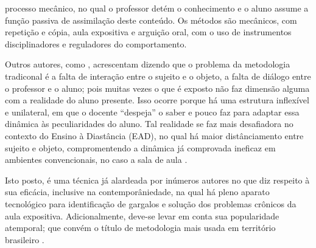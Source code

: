 \begin{customquote}
    [...] processo mecânico, no qual o professor detém o conhecimento e o aluno assume a função passiva de assimilação deste conteúdo. Os métodos são mecânicos, com repetição e cópia, aula expositiva e arguição oral, com o uso de instrumentos disciplinadores e reguladores do comportamento. \cite{baldanRepresentacaoAtoEnsinar2011}
\end{customquote}

Outros autores, como , acrescentam dizendo que o problema da metodologia tradiconal é a falta de interação entre o sujeito e o objeto, a falta de diálogo entre o professor e o aluno; pois muitas vezes o que é exposto não faz dimensão alguma com a realidade do aluno presente. Isso ocorre porque há uma estrutura inflexível e unilateral, em que o docente ``despeja'' o saber e pouco faz para adaptar essa dinâmica às peculiaridades do aluno. Tal realidade se faz mais desafiadora no contexto do Ensino à Diastância (EAD), no qual há maior distânciamento entre sujeito e objeto, compromentendo a dinâmica já comprovada ineficaz em ambientes convencionais, no caso a sala de aula \cite{vasconcellosMetodologiaDialeticaEm1992}.

Isto posto, é uma técnica já alardeada por inúmeros autores no que diz respeito à sua eficácia, inclusive na contemporâniedade, na qual há pleno aparato tecnológico para identificação de gargalos e solução dos problemas crônicos da aula expositiva. Adicionalmente, deve-se levar em conta sua popularidade atemporal; que convém o título de metodologia mais  usada em território brasileiro \cite{nerici1968introducao}.